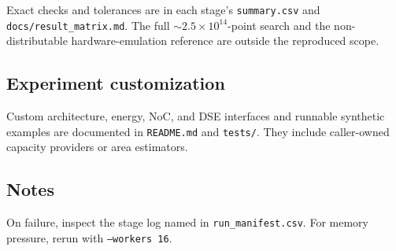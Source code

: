 \documentclass[10pt,twocolumn]{article}
\newcommand{\code}[1]{\texttt{#1}}
\begin{document}
Exact checks and tolerances are in each stage's \code{summary.csv} and
\code{docs/result\_matrix.md}. The full $\sim$$2.5\times10^{14}$-point search
and the non-distributable hardware-emulation reference are outside the
reproduced scope.

\subsection{Experiment customization}

Custom architecture, energy, NoC, and DSE interfaces and runnable synthetic
examples are documented in \code{README.md} and \code{tests/}. They include
caller-owned capacity providers or area estimators.

\subsection{Notes}

On failure, inspect the stage log named in \code{run\_manifest.csv}. For
memory pressure, rerun with \code{--workers 16}.
\end{document}
